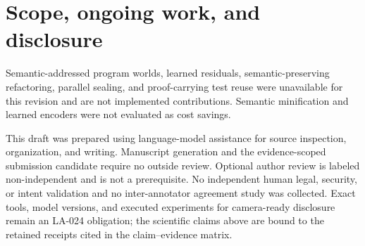 \documentclass{article}
\begin{document}
\section{Scope, ongoing work, and disclosure}

Semantic-addressed program worlds, learned residuals, semantic-preserving refactoring, parallel sealing, and proof-carrying test reuse were unavailable for this revision and are not implemented contributions. Semantic minification and learned encoders were not evaluated as cost savings.

This draft was prepared using language-model assistance for source inspection, organization, and writing. Manuscript generation and the evidence-scoped submission candidate require no outside review. Optional author review is labeled non-independent and is not a prerequisite. No independent human legal, security, or intent validation and no inter-annotator agreement study was collected. Exact tools, model versions, and executed experiments for camera-ready disclosure remain an LA-024 obligation; the scientific claims above are bound to the retained receipts cited in the claim--evidence matrix.
\end{document}
